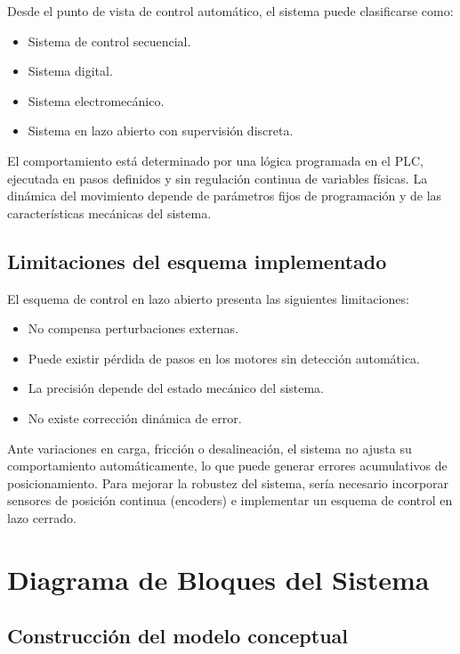 \documentclass[a4paper,12pt]{article}
\begin{document}
Desde el punto de vista de control automático, el sistema puede clasificarse como:

\begin{itemize}
    \item Sistema de control secuencial.
    \item Sistema digital.
    \item Sistema electromecánico.
    \item Sistema en lazo abierto con supervisión discreta.
\end{itemize}

El comportamiento está determinado por una lógica programada en el PLC, ejecutada en pasos definidos y sin regulación continua de variables físicas. La dinámica del movimiento depende de parámetros fijos de programación y de las características mecánicas del sistema.

\subsection{Limitaciones del esquema implementado}

El esquema de control en lazo abierto presenta las siguientes limitaciones:

\begin{itemize}
    \item No compensa perturbaciones externas.
    \item Puede existir pérdida de pasos en los motores sin detección automática.
    \item La precisión depende del estado mecánico del sistema.
    \item No existe corrección dinámica de error.
\end{itemize}

Ante variaciones en carga, fricción o desalineación, el sistema no ajusta su comportamiento automáticamente, lo que puede generar errores acumulativos de posicionamiento. Para mejorar la robustez del sistema, sería necesario incorporar sensores de posición continua (encoders) e implementar un esquema de control en lazo cerrado.

\section{Diagrama de Bloques del Sistema}

\subsection{Construcción del modelo conceptual}
\end{document}
